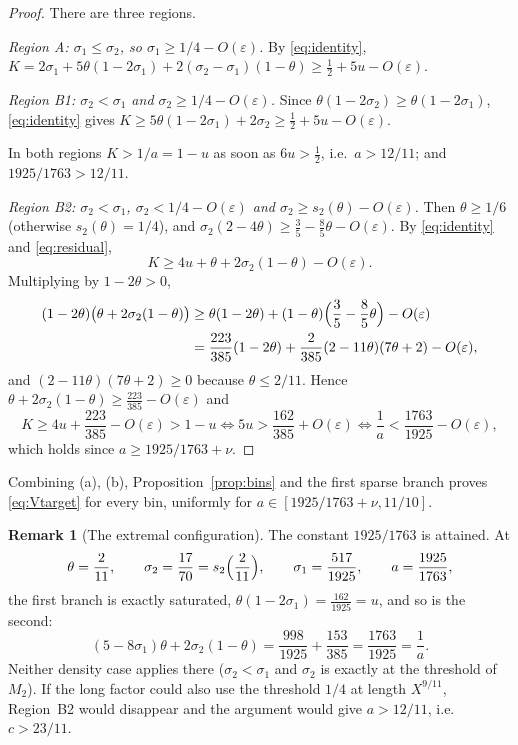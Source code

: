 \documentclass[11pt,a4paper]{amsart}
\theoremstyle{definition}
\newtheorem{remark}[theorem]{Remark}
\newcommand{\e}{\varepsilon}
\newcommand{\1}{\mathbf 1}
\begin{document}
\begin{proof}
There are three regions.

\emph{Region A: \(\sigma_1\le\sigma_2\), so \(\sigma_1\ge1/4-O(\e)\).}
By \eqref{eq:identity},
\(K=2\sigma_1+5\theta(1-2\sigma_1)+2(\sigma_2-\sigma_1)(1-\theta)
 \ge\frac12+5u-O(\e)\).

\emph{Region B1: \(\sigma_2<\sigma_1\) and \(\sigma_2\ge1/4-O(\e)\).}
Since \(\theta(1-2\sigma_2)\ge\theta(1-2\sigma_1)\), \eqref{eq:identity}
gives \(K\ge5\theta(1-2\sigma_1)+2\sigma_2\ge\frac12+5u-O(\e)\).

In both regions \(K>1/a=1-u\) as soon as \(6u>\frac12\), i.e.\
\(a>12/11\); and \(1925/1763>12/11\).

\emph{Region B2: \(\sigma_2<\sigma_1\), \(\sigma_2<1/4-O(\e)\) and
\(\sigma_2\ge s_2(\theta)-O(\e)\).}  Then \(\theta\ge1/6\) (otherwise
\(s_2(\theta)=1/4\)), and
\(\sigma_2(2-4\theta)\ge\frac35-\frac85\theta-O(\e)\).  By
\eqref{eq:identity} and \eqref{eq:residual},
\[
 K\ge4u+\theta+2\sigma_2(1-\theta)-O(\e).
\]
Multiplying by \(1-2\theta>0\),
\begin{align*}
 (1-2\theta)\bigl(\theta+2\sigma_2(1-\theta)\bigr)
 &\ge\theta(1-2\theta)+(1-\theta)\Bigl(\frac35-\frac85\theta\Bigr)-O(\e)\\
 &=\frac{223}{385}(1-2\theta)+\frac2{385}(2-11\theta)(7\theta+2)-O(\e),
\end{align*}
and \((2-11\theta)(7\theta+2)\ge0\) because \(\theta\le2/11\).  Hence
\(\theta+2\sigma_2(1-\theta)\ge\frac{223}{385}-O(\e)\) and
\[
 K\ge4u+\frac{223}{385}-O(\e)>1-u
 \iff 5u>\frac{162}{385}+O(\e)
 \iff \frac1a<\frac{1763}{1925}-O(\e),
\]
which holds since \(a\ge1925/1763+\nu\).
\end{proof}

Combining (a), (b), Proposition~\ref{prop:bins} and the first sparse
branch proves \eqref{eq:Vtarget} for every bin, uniformly for
\(a\in[1925/1763+\nu,11/10]\).

\begin{remark}[The extremal configuration]
The constant \(1925/1763\) is attained.  At
\[
 \theta=\frac2{11},\qquad\sigma_2=\frac{17}{70}=s_2\Bigl(\frac2{11}\Bigr),
 \qquad\sigma_1=\frac{517}{1925},\qquad a=\frac{1925}{1763},
\]
the first branch is exactly saturated, \(\theta(1-2\sigma_1)=\frac{162}{1925}=u\),
and so is the second:
\[
 (5-8\sigma_1)\theta+2\sigma_2(1-\theta)
 =\frac{998}{1925}+\frac{153}{385}=\frac{1763}{1925}=\frac1a .
\]
Neither density case applies there (\(\sigma_2<\sigma_1\) and \(\sigma_2\)
is exactly at the threshold of \(M_2\)).  If the long factor could also
use the threshold \(1/4\) at length \(X^{9/11}\), Region~B2 would
disappear and the argument would give \(a>12/11\), i.e.\ \(c>23/11\).
\end{remark}
\end{document}
